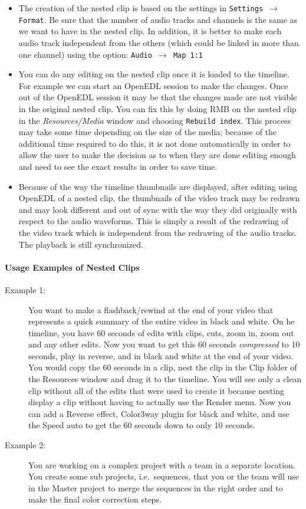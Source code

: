 \begin{itemize}
	\item The creation of the nested clip is based on the settings in \texttt{Settings $\rightarrow$ Format}. Be sure that the number of audio tracks and channels is the same as we want to have in the nested clip. In addition, it is better to make each audio track independent from the others (which could be linked in more than one channel) using the option: \texttt{Audio $\rightarrow$ Map 1:1}
	\item You can do any editing on the nested clip once it is loaded to the timeline. For example we can start an OpenEDL  session to make the changes. Once out of the OpenEDL session it may be that the changes made are not visible in the original nested clip. You can fix this by doing RMB on the nested clip in the \textit{Resources/Media} window and choosing \texttt{Rebuild index}. This process may take some time depending on the size of
the media; because of the additional time required to do this, it is not done automatically in order to allow the user to make the decision as to when they are done editing enough and need to see the exact results
in order to save time.
	\item Because of the way the timeline thumbnails are displayed, after editing using OpenEDL of a
nested clip, the thumbnails of the video track may be redrawn and may look different and out of sync with the
way they did originally with respect to the audio waveforms. This is simply a result of the redrawing of the
video track which is independent from the redrawing of the audio tracks. The playback is still synchronized.
\end{itemize}

\paragraph{Usage Examples of Nested Clips}

\begin{description}
	\item[Example 1:] You want to make a flashback/rewind at the end
	of your video that represents a quick summary of the entire video in
	black and white. On he timeline, you have 60 seconds of edits with
	clips, cuts, zoom in, zoom out and any other edits. Now you want to
	get this 60 seconds \textit{compressed} to 10 seconds, play in
	reverse, and in black and white at the end of your video.  You would
	copy the 60 seconds in a clip, nest the clip in the Clip folder of
	the Resources window and drag it to the timeline. You will see only
	a clean clip without all of the edits that were used to create it
	because nesting display a clip without having to actually use the
	Render menu.  Now you can add a Reverse effect, Color3way plugin for
	black and white, and use the Speed auto to get the 60 seconds down
	to only 10 seconds.
	\item[Example 2:] You are working on a complex project with a
	team in a separate location. You create some sub projects, i.e.\
	sequences, that you or the team will use in the Master project to
	merge the sequences in the right order and to make the final color
	correction steps.
\end{description}

